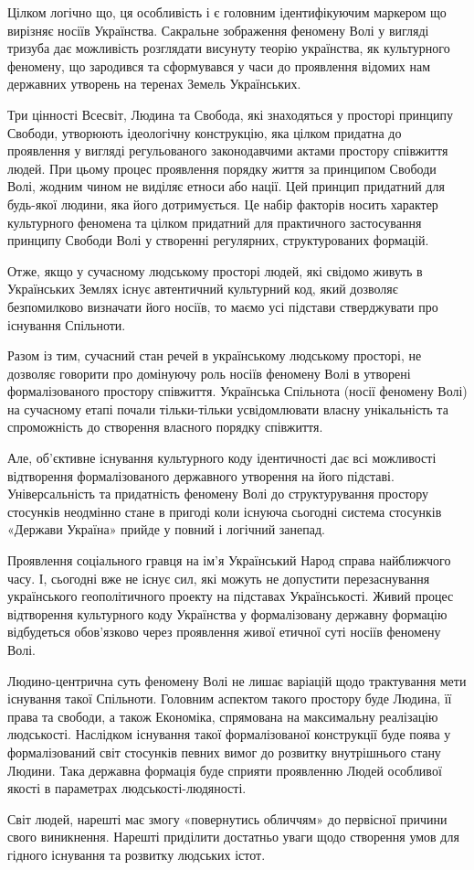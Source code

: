 Цілком логічно що, ця особливість і є головним ідентифікуючим маркером що
вирізняє носіїв Українства. Сакральне зображення феномену Волі у вигляді
тризуба дає можливість розглядати висунуту теорію українства, як культурного
феномену, що зародився та сформувався у часи до проявлення відомих нам
державних утворень на теренах Земель Українських.

Три цінності Всесвіт, Людина та Свобода, які знаходяться у просторі принципу
Свободи, утворюють ідеологічну конструкцію, яка цілком придатна до проявлення у
вигляді регульованого законодавчими актами простору співжиття людей. При цьому
процес проявлення порядку життя за принципом Свободи Волі, жодним чином не
виділяє етноси або нації. Цей принцип придатний для будь-якої людини, яка його
дотримується. Це набір факторів носить характер культурного феномена та цілком
придатний для практичного застосування принципу Свободи Волі у створенні
регулярних, структурованих формацій.

Отже, якщо у сучасному людському просторі людей, які свідомо живуть в
Українських Землях існує автентичний культурний код, який дозволяє безпомилково
визначати його носіїв, то маємо усі підстави стверджувати про існування
Спільноти.

Разом із тим, сучасний стан речей в українському людському просторі, не
дозволяє говорити про домінуючу роль носіїв феномену Волі в утворені
формалізованого простору співжиття. Українська Спільнота (носії феномену Волі)
на сучасному етапі почали тільки-тільки усвідомлювати власну унікальність та
спроможність до створення власного порядку співжиття.

Але, об’єктивне існування культурного коду ідентичності дає всі можливості
відтворення формалізованого державного утворення на його підставі.
Універсальність та придатність феномену Волі до структурування простору
стосунків неодмінно стане в пригоді коли існуюча сьогодні система стосунків
«Держави Україна» прийде у повний і логічний занепад.

Проявлення соціального гравця на ім’я Український Народ справа найближчого
часу. І, сьогодні вже не існує сил, які можуть не допустити перезаснування
українського геополітичного проекту на підставах Українськості. Живий процес
відтворення культурного коду Українства у формалізовану державну формацію
відбудеться обов’язково через проявлення живої етичної суті носіїв феномену
Волі.

Людино-центрична суть феномену Волі не лишає варіацій щодо трактування мети
існування такої Спільноти. Головним аспектом такого простору буде Людина, її
права та свободи, а також Економіка, спрямована на максимальну реалізацію
людськості. Наслідком існування такої формалізованої конструкції буде поява у
формалізований світ стосунків певних вимог до розвитку внутрішнього стану
Людини. Така державна формація буде сприяти проявленню Людей особливої якості в
параметрах людськості-людяності.

Світ людей, нарешті має змогу «повернутись обличчям» до первісної причини свого
виникнення. Нарешті приділити достатньо уваги щодо створення умов для гідного
існування та розвитку людських істот.
